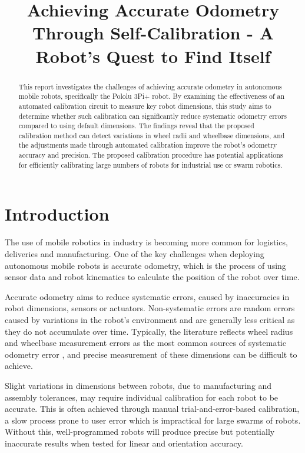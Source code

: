 \documentclass[conference]{IEEEtran}
\begin{document}
\title{Achieving Accurate Odometry Through Self-Calibration - A Robot's Quest to Find Itself}

\author{
    \and
}

\maketitle

\begin{abstract}

This report investigates the challenges of achieving accurate odometry in autonomous mobile robots, specifically the Pololu 3Pi+ robot. 
By examining the effectiveness of an automated calibration circuit to measure key robot dimensions, this study aims to determine whether such calibration can significantly reduce systematic odometry errors compared to using default dimensions. 
The findings reveal that the proposed calibration method can detect variations in wheel radii and wheelbase dimensions, and the adjustments made through automated calibration improve the robot's odometry accuracy and precision. 
The proposed calibration procedure has potential applications for efficiently calibrating large numbers of robots for industrial use or swarm robotics.
\end{abstract}


\section{Introduction}\label{sec:intro}

The use of mobile robotics in industry is becoming more common for logistics, deliveries and manufacturing.
One of the key challenges when deploying autonomous mobile robots is accurate odometry, which is the process of using sensor data and robot kinematics to calculate the position of the robot over time.

Accurate odometry aims to reduce systematic errors, caused by inaccuracies in robot dimensions, sensors or actuators. Non-systematic errors are random errors caused by variations in the robot's environment and are generally less critical as they do not accumulate over time.
Typically, the literature reflects wheel radius and wheelbase measurement errors as the most common sources of systematic odometry error \cite{UMBmark, width-radius}, and precise measurement of these dimensions can be difficult to achieve.

Slight variations in dimensions between robots, due to manufacturing and assembly tolerances, may require individual calibration for each robot to be accurate.
This is often achieved through manual trial-and-error-based calibration, a slow process prone to user error which is impractical for large swarms of robots. 
Without this, well-programmed robots will produce precise but potentially inaccurate results when tested for linear and orientation accuracy.
\end{document}
